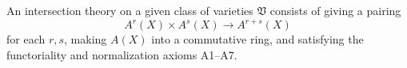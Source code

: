 An intersection theory on a given class of varieties $\mathfrak{V}$ consists of giving a pairing
$$A^r(X) \times A^s(X) \to A^{r+s}(X)$$
for each $r,s$, making $A(X)$ into a commutative ring, and satisfying the functoriality and normalization axioms A1--A7.
